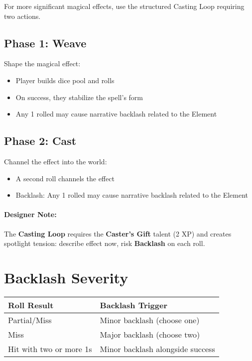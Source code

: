 For more significant magical effects, use the structured Casting Loop requiring two actions.

\subsection*{Phase 1: Weave} 
Shape the magical effect:
\begin{itemize}
\item Player builds dice pool and rolls
\item On success, they stabilize the spell's form
\item Any 1 rolled may cause narrative backlash related to the Element
\end{itemize}

\subsection*{Phase 2: Cast} 
Channel the effect into the world:
\begin{itemize}
\item A second roll channels the effect
\item Backlash: Any 1 rolled may cause narrative backlash related to the Element
\end{itemize}

\paragraph{Designer Note:}
The \textbf{Casting Loop} requires the \textbf{Caster's Gift} talent (2 XP) and creates spotlight tension: describe effect now, risk \textbf{Backlash} on each roll.

\section{Backlash Severity} 

\begin{center}
\small
\begin{tabular}{ll}
\toprule
\textbf{Roll Result} & \textbf{Backlash Trigger} \\
\midrule
Partial/Miss & Minor backlash (choose one) \\
Miss & Major backlash (choose two) \\
Hit with two or more 1s & Minor backlash alongside success \\
\bottomrule
\end{tabular}
\end{center}

